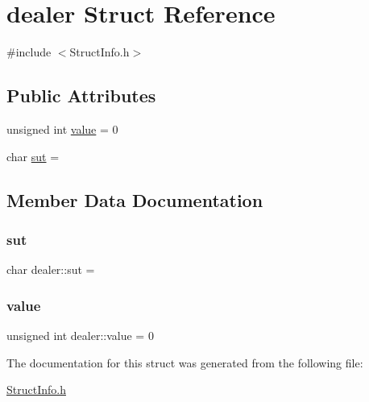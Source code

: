 \hypertarget{structdealer}{}\section{dealer Struct Reference}
\label{structdealer}


{\ttfamily \#include $<$Struct\+Info.\+h$>$}

\subsection*{Public Attributes}
\begin{DoxyCompactItemize}
\item 
unsigned int \hyperlink{structdealer_a219ecd2fac1ba66a587925272daebb44}{value} = 0
\item 
char \hyperlink{structdealer_a28b9fe01490dca507c3caa87a57854ca}{sut} = \textquotesingle{} \textquotesingle{}
\end{DoxyCompactItemize}


\subsection{Member Data Documentation}
\hypertarget{structdealer_a28b9fe01490dca507c3caa87a57854ca}{}\label{structdealer_a28b9fe01490dca507c3caa87a57854ca} 
\subsubsection{\texorpdfstring{sut}{sut}}
{\footnotesize\ttfamily char dealer\+::sut = \textquotesingle{} \textquotesingle{}}

\hypertarget{structdealer_a219ecd2fac1ba66a587925272daebb44}{}\label{structdealer_a219ecd2fac1ba66a587925272daebb44} 
\subsubsection{\texorpdfstring{value}{value}}
{\footnotesize\ttfamily unsigned int dealer\+::value = 0}



The documentation for this struct was generated from the following file\+:\begin{DoxyCompactItemize}
\item 
\hyperlink{_struct_info_8h}{Struct\+Info.\+h}\end{DoxyCompactItemize}

